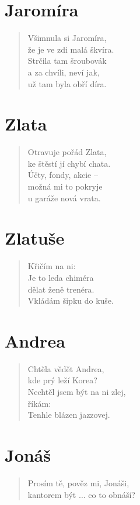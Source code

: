 \section*{Jaromíra}
\begin{verse}
Všimnula si Jaromíra,\\
že je ve zdi malá škvíra.\\
Strčila tam šroubovák\\
a za chvíli, neví jak,\\
už tam byla obří díra.
\end{verse}

\section*{Zlata}
\begin{verse}
Otravuje pořád Zlata,\\
ke štěstí jí chybí chata.\\
Účty, fondy, akcie --\\
možná mi to pokryje\\
u garáže nová vrata.
\end{verse}

\section*{Zlatuše}
\begin{verse}
Křičím na ni: \\
Je to leda chiméra\\
dělat ženě trenéra.\\
Vkládám šipku do kuše.
\end{verse}

\section*{Andrea}
\begin{verse}
Chtěla vědět Andrea,\\
kde prý leží Korea?\\
Nechtěl jsem být na ni zlej,\\
říkám: \\
Tenhle blázen jazzovej.
\end{verse}

\section*{Jonáš}
\begin{verse}
Prosím tě, pověz mi, Jonáši,\\
kantorem být $\ldots${} co to obnáší?\\
\end{verse}

